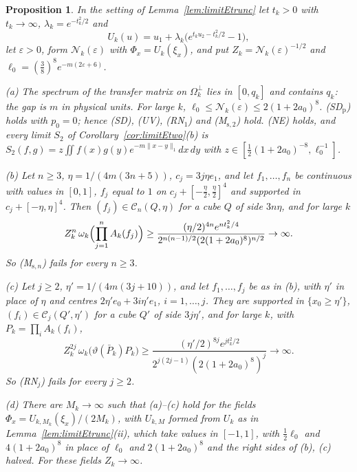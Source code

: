 \documentclass[aps,prd,twocolumn,superscriptaddress,nofootinbib,longbibliography,floatfix,amsmath,amssymb,10pt]{revtex4-2}
\newtheorem{proposition}[theorem]{Proposition}
\theoremstyle{definition}
\theoremstyle{remark}
\begin{document}
\begin{proposition}\label{prop:limitEthree}
In the setting of Lemma~\textup{\ref{lem:limitEtrunc}} let $t_k>0$ with
$t_k\to\infty$, $\lambda_k=e^{-t_k^2/2}$ and
\[
U_k(u)=u_1+\lambda_k\bigl(e^{t_ku_2-t_k^2/2}-1\bigr),
\]
let $\varepsilon>0$, form $\mathcal N_k(\varepsilon)$ with $\Phi_x=U_k(\xi_x)$,
and put $Z_k=\mathcal N_k(\varepsilon)^{-1/2}$ and $\ell_0=(\frac38)^8
e^{-m(2\varepsilon+6)}$.

\textup{(a)} The spectrum of the transfer matrix on $\Omega_k^\perp$ lies in
$[0,q_k]$ and contains $q_k$: the gap is $m$ in physical units. For large
$k$, $\ell_0\le\mathcal N_k(\varepsilon)\le2(1+2a_0)^8$. \textup{(SD$_{\mathrm
p}$)} holds with $p_0=0$; hence \textup{(SD)}, \textup{(UV)},
\textup{(RN$_1$)} and \textup{(M$_{\mathrm s,2}$)} hold. \textup{(NE)} holds,
and every limit $S_2$ of Corollary~\textup{\ref{cor:limitEtwo}(b)} is
$S_2(f,g)=z\iint f(x)g(y)e^{-m\|x-y\|_1}dx\,dy$ with $z\in[\frac12(1+2a_0)^{-8},
\ell_0^{-1}]$.

\textup{(b)} Let $n\ge3$, $\eta=1/(4m(3n+5))$, $c_j=3j\eta e_1$, and let
$f_1,\dots,f_n$ be continuous with values in $[0,1]$, $f_j$ equal to $1$ on
$c_j+[-\frac\eta2,\frac\eta2]^4$ and supported in $c_j+[-\eta,\eta]^4$.
Then $(f_j)\in\mathcal C_n(Q,\eta)$ for a cube $Q$ of side $3n\eta$, and for
large $k$
\[
Z_k^n\,\omega_k\Bigl(\prod_{j=1}^nA_k(f_j)\Bigr)\ge\frac{(\eta/2)^{4n}
e^{nt_k^2/4}}{2^{n(n-1)/2}(2(1+2a_0)^8)^{n/2}}\to\infty .
\]
So \textup{(M$_{\mathrm s,n}$)} fails for every $n\ge3$.

\textup{(c)} Let $j\ge2$, $\eta'=1/(4m(3j+10))$, and let $f_1,\dots,f_j$ be
as in \textup{(b)}, with $\eta'$ in place of $\eta$ and centres
$2\eta'e_0+3i\eta'e_1$, $i=1,\dots,j$. They are supported in
$\{x_0\ge\eta'\}$, $(f_i)\in\mathcal C_j(Q',\eta')$ for a cube $Q'$ of side
$3j\eta'$, and for large $k$, with $P_k=\prod_iA_k(f_i)$,
\[
Z_k^{2j}\,\omega_k\bigl(\vartheta(\bar P_k)P_k\bigr)\ge\frac{(\eta'/2)^{8j}
e^{jt_k^2/2}}{2^{j(2j-1)}(2(1+2a_0)^8)^j}\to\infty .
\]
So \textup{(RN$_j$)} fails for every $j\ge2$.

\textup{(d)} There are $M_k\to\infty$ such that \textup{(a)--(c)} hold for
the fields $\Phi_x=U_{k,M_k}(\xi_x)/(2M_k)$, with $U_{k,M}$ formed from $U_k$
as in Lemma~\textup{\ref{lem:limitEtrunc}(ii)}, which take values in
$[-1,1]$, with $\frac12\ell_0$ and $4(1+2a_0)^8$ in place of $\ell_0$ and
$2(1+2a_0)^8$ and the right sides of \textup{(b)}, \textup{(c)} halved. For
these fields $Z_k\to\infty$.
\end{proposition}
\end{document}
